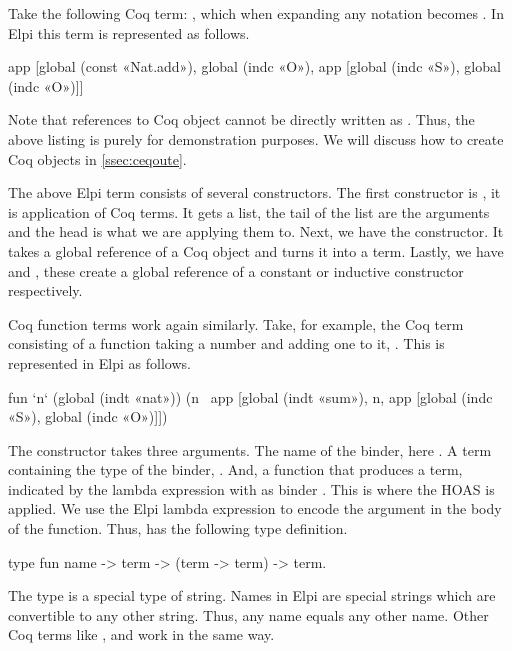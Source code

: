 \documentclass[thesis.tex]{subfiles}
\begin{document}
{{Take the following Coq term: , which when expanding any notation becomes . In Elpi this term is represented as follows.
\begin{elpicode}
  app [global (const «Nat.add»), 
      global (indc «O»), 
      app [global (indc «S»), global (indc «O»)]]
\end{elpicode}
Note that references to Coq object cannot be directly written as . Thus, the above listing is purely for demonstration purposes. We will discuss how to create Coq objects in \cref{ssec:ceqoute}.

The above Elpi term consists of several constructors. The first constructor is , it is application of Coq terms. It gets a list, the tail of the list are the arguments and the head is what we are applying them to. Next, we have the  constructor. It takes a global reference of a Coq object and turns it into a term. Lastly, we have  and , these create a global reference of a constant or inductive constructor respectively.

Coq function terms work again similarly. Take, for example, the Coq term consisting of a function taking a number and adding one to it, . This is represented in Elpi as follows.
\begin{elpicode}
  fun `n` (global (indt «nat»)) 
            (n \ app [global (indt «sum»), 
                      n, app [global (indc «S»), 
                              global (indc «O»)]])
\end{elpicode}
The  constructor takes three arguments. The name of the binder, here . A term containing the type of the binder, . And, a function that produces a term, indicated by the lambda expression with as binder . This is where the HOAS is applied. We use the Elpi lambda expression to encode the argument in the body of the function. Thus,  has the following type definition.
\begin{elpicode}
  type fun name -> term -> (term -> term) -> term.
\end{elpicode}
The type  is a special type of string. Names in Elpi are special strings which are convertible to any other string. Thus, any name equals any other name. Other Coq terms like ,  and  work in the same way.

}}
\end{document}
